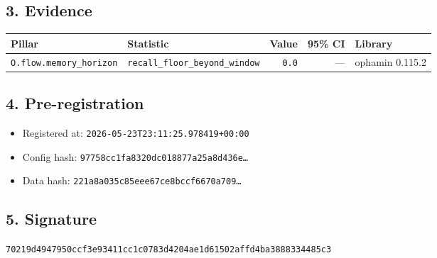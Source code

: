 \documentclass{article}
\begin{document}
\subsection*{3. Evidence}
\begin{tabular}{llrrl}\toprule
\textbf{Pillar} & \textbf{Statistic} & \textbf{Value} & \textbf{95\% CI} & \textbf{Library} \\\midrule
\texttt{O.flow.memory\_horizon} & \texttt{recall\_floor\_beyond\_window} & \texttt{0.0} & --- & ophamin 0.115.2 \\
\bottomrule\end{tabular}
\subsection*{4. Pre-registration}
\begin{itemize}
\item Registered at: \texttt{2026-05-23T23:11:25.978419+00:00}
\item Config hash: \texttt{97758cc1fa8320dc018877a25a8d436e\dots}
\item Data hash: \texttt{221a8a035c85eee67ce8bccf6670a709\dots}
\end{itemize}
\subsection*{5. Signature}
\texttt{70219d4947950ccf3e93411cc1c0783d4204ae1d61502affd4ba3888334485c3}\\
\end{document}
